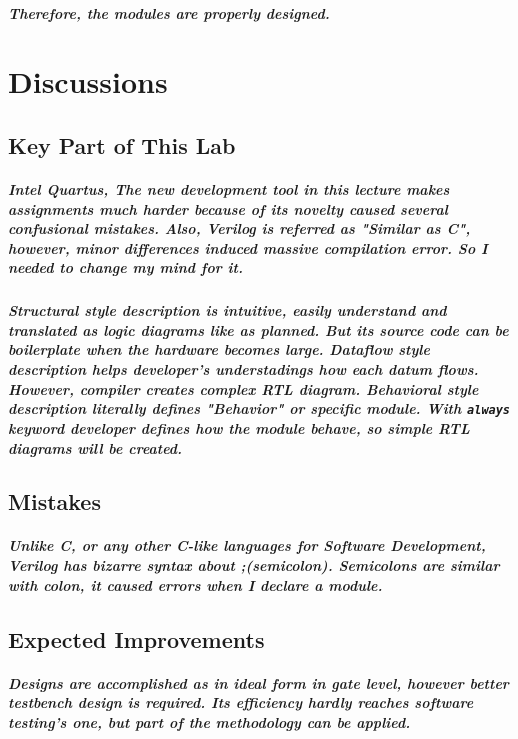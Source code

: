 \documentclass{report}
\begin{document}
        \paragraph{\normalfont Therefore, the modules are properly designed.}
    \chapter{Discussions}
        \section{Key Part of This Lab}
        
        \paragraph{\normalfont Intel Quartus, The new development tool in this lecture makes assignments much harder because of its novelty caused several confusional mistakes. Also, Verilog is referred as "Similar as C", however, minor differences induced massive compilation error. So I needed to change my mind for it.}

        \paragraph{\normalfont Structural style description is intuitive, easily understand and translated as logic diagrams like as planned. But its source code can be boilerplate when the hardware becomes large. Dataflow style description helps developer's understadings how each datum flows. However, compiler creates complex RTL diagram. Behavioral style description literally defines "Behavior" or specific module. With \texttt{always} keyword developer defines how the module behave, so simple RTL diagrams will be created.}

        \section{Mistakes}

        \paragraph{\normalfont Unlike C, or any other C-like languages for Software Development, Verilog has bizarre syntax about ;(semicolon). Semicolons are similar with colon, it caused errors when I declare a module.}

        \section{Expected Improvements}

        \paragraph{\normalfont Designs are accomplished as in ideal form in gate level, however better testbench design is required. Its efficiency hardly reaches software testing's one, but part of the methodology can be applied.}
\end{document}
